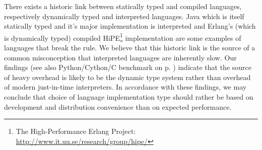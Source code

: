 There exists a historic link between statically typed and compiled languages, respectively
dynamically typed and interpreted languages. Java which is itself statically typed and it's major
implementation is interpreted and Erlang's (which is dynamically typed) compiled
HiPE\footnote{The High-Performance Erlang Project: \url{http://www.it.uu.se/research/group/hipe/}}
implementation are some examples of languages that break the rule. We believe that this historic
link is the source of a common misconception that interpreted languages are inherently slow. Our
findings (see also Python/Cython/C benchmark on p. \pageref{sec:CythonPerformace}) indicate that
the source of heavy overhead is likely to be the dynamic type system rather than overhead of modern
just-in-time interpreters. In accordance with these findings, we may conclude that choice of language
implementation type should rather be based on development and distribution convenience than on
expected performance.

